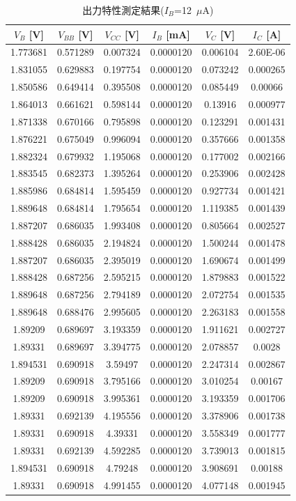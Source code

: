 \documentclass[11pt,dvipdfmx]{jarticle}
\begin{document}
		\begin{table}[H]
			\centering
			\caption{出力特性測定結果($I_B$=12\ $\mu$A)}
			\begin{tabular}{cccccc}
			\hline
			$V_B$ [V]& $V_{BB}$ [V]& $V_{CC}$ [V]& $I_B$ [mA]& $V_C$ [V]& $I_C$ [A]\\\hline\hline
			1.773681 & 0.571289 & 0.007324 & 0.0000120 & 0.006104 & 2.60E-06 \\
			1.831055 & 0.629883 & 0.197754 & 0.0000120 & 0.073242 & 0.000265 \\
			1.850586 & 0.649414 & 0.395508 & 0.0000120 & 0.085449 & 0.00066 \\
			1.864013 & 0.661621 & 0.598144 & 0.0000120 & 0.13916 & 0.000977 \\
			1.871338 & 0.670166 & 0.795898 & 0.0000120 & 0.123291 & 0.001431 \\
			1.876221 & 0.675049 & 0.996094 & 0.0000120 & 0.357666 & 0.001358 \\
			1.882324 & 0.679932 & 1.195068 & 0.0000120 & 0.177002 & 0.002166 \\
			1.883545 & 0.682373 & 1.395264 & 0.0000120 & 0.253906 & 0.002428 \\
			1.885986 & 0.684814 & 1.595459 & 0.0000120 & 0.927734 & 0.001421 \\
			1.889648 & 0.684814 & 1.795654 & 0.0000120 & 1.119385 & 0.001439 \\
			1.887207 & 0.686035 & 1.993408 & 0.0000120 & 0.805664 & 0.002527 \\
			1.888428 & 0.686035 & 2.194824 & 0.0000120 & 1.500244 & 0.001478 \\
			1.887207 & 0.686035 & 2.395019 & 0.0000120 & 1.690674 & 0.001499 \\
			1.888428 & 0.687256 & 2.595215 & 0.0000120 & 1.879883 & 0.001522 \\
			1.889648 & 0.687256 & 2.794189 & 0.0000120 & 2.072754 & 0.001535 \\
			1.889648 & 0.688476 & 2.995605 & 0.0000120 & 2.263183 & 0.001558 \\
			1.89209 & 0.689697 & 3.193359 & 0.0000120 & 1.911621 & 0.002727 \\
			1.89331 & 0.689697 & 3.394775 & 0.0000120 & 2.078857 & 0.0028 \\
			1.894531 & 0.690918 & 3.59497 & 0.0000120 & 2.247314 & 0.002867 \\
			1.89209 & 0.690918 & 3.795166 & 0.0000120 & 3.010254 & 0.00167 \\
			1.89209 & 0.690918 & 3.995361 & 0.0000120 & 3.193359 & 0.001706 \\
			1.89331 & 0.692139 & 4.195556 & 0.0000120 & 3.378906 & 0.001738 \\
			1.89331 & 0.690918 & 4.39331 & 0.0000120 & 3.558349 & 0.001777 \\
			1.89331 & 0.692139 & 4.592285 & 0.0000120 & 3.739013 & 0.001815 \\
			1.894531 & 0.690918 & 4.79248 & 0.0000120 & 3.908691 & 0.00188 \\
			1.89331 & 0.690918 & 4.991455 & 0.0000120 & 4.077148 & 0.001945 \\
			\hline
			\end{tabular}
			\label{tab:出力特性測定結果12}
		\end{table}
\end{document}
